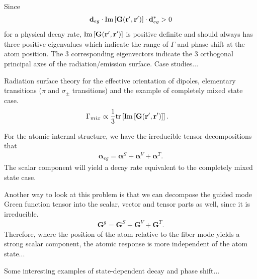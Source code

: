 \documentclass[preprint,aps,pra,onecolumn]{revtex4-1} %
\begin{document}
Since 
\begin{align}
\mathbf{d}_{eg}\cdot \mathrm{Im}\left[\mathbf{G}(\mathbf{r}',\mathbf{r}') \right]\cdot\mathbf{d}_{eg}^*>0
\end{align}
for a physical decay rate, $\mathrm{Im}\left[\mathbf{G}(\mathbf{r}',\mathbf{r}')\right]$ is positive definite and should always has three positive eigenvalues which indicate the range of $ \Gamma $ and phase shift at the atom position. The 3 corresponding eigenvectors indicate the 3 orthogonal principal axes of the radiation/emission surface. Case studies...

Radiation surface theory for the effective orientation of dipoles, elementary transitions ($ \pi $ and $ \sigma_\pm $ transitions) and the example of completely mixed state case. 
\begin{align}
\Gamma_{mix} &\propto \frac{1}{3} \mathrm{tr}\left[ \mathrm{Im}\left[\mathbf{G}(\mathbf{r}',\mathbf{r}')\right] \right].
\end{align}

For the atomic internal structure, we have the irreducible tensor decompositions that 
\begin{align}
\boldsymbol{\alpha}_{eg} = \boldsymbol{\alpha}^S + \boldsymbol{\alpha}^V + \boldsymbol{\alpha}^T.
\end{align}
The scalar component will yield a decay rate equivalent to the completely mixed state case. 

Another way to look at this problem is that we can decompose the guided mode Green function tensor into the scalar, vector and tensor parts as well, since it is irreducible.
\begin{align}
\mathbf{G}^g=\mathbf{G}^S+\mathbf{G}^V+\mathbf{G}^T.
\end{align}
Therefore, where the position of the atom relative to the fiber mode yields a strong scalar component, the atomic response is more independent of the atom state... 

Some interesting examples of state-dependent decay and phase shift...



%
%

\ifwindows
	
\else
	
\fi
\end{document}
